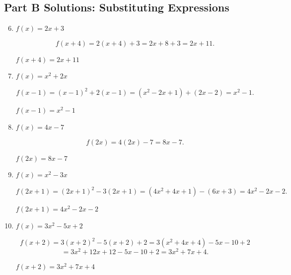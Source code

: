 \documentclass[14pt]{extarticle}
\begin{document}
\subsection*{Part B Solutions: Substituting Expressions}
\begin{enumerate}
  \setcounter{enumi}{5}
  \item \(f(x) = 2x + 3\)

  \[
  f(x + 4) = 2(x + 4) + 3 = 2x + 8 + 3 = 2x + 11.
  \]

  \(\boxed{f(x + 4) = 2x + 11}\)

  \item \(f(x) = x^2 + 2x\)

  \[
  f(x - 1) = (x - 1)^2 + 2(x - 1)
  = (x^2 - 2x + 1) + (2x - 2)
  = x^2 - 1.
  \]

  \(\boxed{f(x - 1) = x^2 - 1}\)

  \item \(f(x) = 4x - 7\)

  \[
  f(2x) = 4(2x) - 7 = 8x - 7.
  \]

  \(\boxed{f(2x) = 8x - 7}\)

  \item \(f(x) = x^2 - 3x\)

  \[
  f(2x + 1) = (2x + 1)^2 - 3(2x + 1)
  = (4x^2 + 4x + 1) - (6x + 3)
  = 4x^2 - 2x - 2.
  \]

  \(\boxed{f(2x + 1) = 4x^2 - 2x - 2}\)

  \item \(f(x) = 3x^2 - 5x + 2\)

  \[
  f(x + 2) = 3(x + 2)^2 - 5(x + 2) + 2
  = 3(x^2 + 4x + 4) - 5x - 10 + 2
  \]
  \[
  = 3x^2 + 12x + 12 - 5x - 10 + 2
  = 3x^2 + 7x + 4.
  \]

  \(\boxed{f(x + 2) = 3x^2 + 7x + 4}\)
\end{enumerate}
\end{document}
